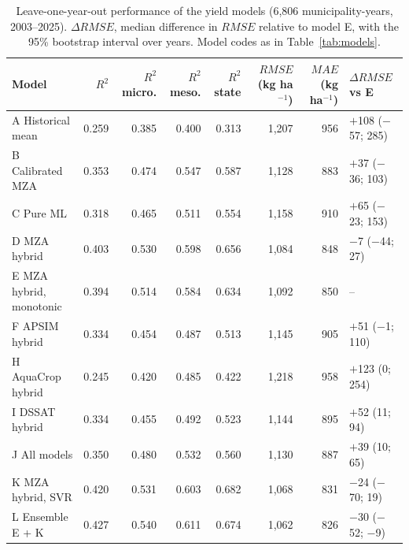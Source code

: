 \documentclass[10pt,a4paper]{article}
\begin{document}
\begin{table}[t]
\centering
\caption{Leave-one-year-out performance of the yield models (6,806 municipality-years, 2003--2025).
$\Delta RMSE$, median difference in $RMSE$ relative to model E, with the 95\% bootstrap interval over
years. Model codes as in Table~\ref{tab:models}.}
\label{tab:validation}
\small
\begin{tabular}{lrrrrrrl}
\toprule
Model & $R^2$ & $R^2$ micro. & $R^2$ meso. & $R^2$ state & $RMSE$ (kg ha$^{-1}$) & $MAE$ (kg ha$^{-1}$) & $\Delta RMSE$ vs E \\
\midrule
A Historical mean   & 0.259 & 0.385 & 0.400 & 0.313 & 1,207 & 956 & $+$108 ($-$57; 285) \\
B Calibrated MZA    & 0.353 & 0.474 & 0.547 & 0.587 & 1,128 & 883 & $+$37 ($-$36; 103) \\
C Pure ML           & 0.318 & 0.465 & 0.511 & 0.554 & 1,158 & 910 & $+$65 ($-$23; 153) \\
D MZA hybrid        & 0.403 & 0.530 & 0.598 & 0.656 & 1,084 & 848 & $-$7 ($-$44; 27) \\
E MZA hybrid, monotonic & 0.394 & 0.514 & 0.584 & 0.634 & 1,092 & 850 & -- \\
F APSIM hybrid      & 0.334 & 0.454 & 0.487 & 0.513 & 1,145 & 905 & $+$51 ($-$1; 110) \\
H AquaCrop hybrid   & 0.245 & 0.420 & 0.485 & 0.422 & 1,218 & 958 & $+$123 (0; 254) \\
I DSSAT hybrid      & 0.334 & 0.455 & 0.492 & 0.523 & 1,144 & 895 & $+$52 (11; 94) \\
J All models        & 0.350 & 0.480 & 0.532 & 0.560 & 1,130 & 887 & $+$39 (10; 65) \\
K MZA hybrid, SVR   & 0.420 & 0.531 & 0.603 & 0.682 & 1,068 & 831 & $-$24 ($-$70; 19) \\
L Ensemble E + K    & 0.427 & 0.540 & 0.611 & 0.674 & 1,062 & 826 & $-$30 ($-$52; $-$9) \\
\bottomrule
\end{tabular}
\end{table}
\end{document}
